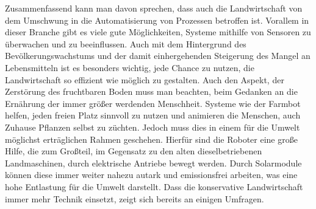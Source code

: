 Zusammenfassend kann man davon sprechen, dass auch die Landwirtschaft von dem
Umschwung in die Automatisierung von Prozessen betroffen ist. Vorallem in
dieser Branche gibt es viele gute Möglichkeiten, Systeme mithilfe von Sensoren
zu überwachen und zu beeinflussen. Auch mit dem Hintergrund des
Bevölkerungswachstums und der damit einhergehenden Steigerung des Mangel an
Lebensmitteln ist es besonders wichtig, jede Chance zu nutzen, die
Landwirtschaft so effizient wie möglich zu gestalten. Auch den Aspekt, der
Zerstörung des fruchtbaren Boden muss man beachten, beim Gedanken an die
Ernährung der immer größer werdenden Menschheit.\cite{rainer2003diskurs} Systeme
wie der Farmbot helfen, jeden freien Platz sinnvoll zu nutzen und animieren die
Menschen, auch Zuhause Pflanzen selbst zu züchten. Jedoch muss dies in einem
für die Umwelt möglichst erträglichen Rahmen geschehen. Hierfür sind die
Roboter eine große Hilfe, die zum Großteil, im Gegensatz zu den alten
dieselbetriebenen Landmaschinen, durch elektrische Antriebe bewegt werden.
Durch Solarmodule können diese immer weiter nahezu autark und emissionsfrei
arbeiten, was eine hohe Entlastung für die Umwelt darstellt. Dass die
konservative Landwirtschaft immer mehr Technik einsetzt, zeigt sich bereits an
einigen Umfragen.
